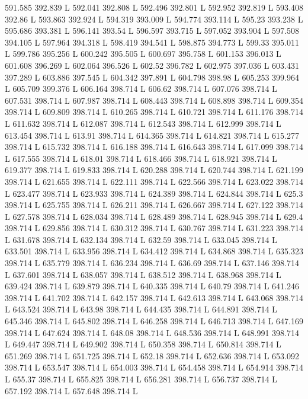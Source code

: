591.585 392.839 L
592.041 392.808 L
592.496 392.801 L
592.952 392.819 L
593.408 392.86 L
593.863 392.924 L
594.319 393.009 L
594.774 393.114 L
595.23 393.238 L
595.686 393.381 L
596.141 393.54 L
596.597 393.715 L
597.052 393.904 L
597.508 394.105 L
597.964 394.318 L
598.419 394.541 L
598.875 394.773 L
599.33 395.011 L
599.786 395.256 L
600.242 395.505 L
600.697 395.758 L
601.153 396.013 L
601.608 396.269 L
602.064 396.526 L
602.52 396.782 L
602.975 397.036 L
603.431 397.289 L
603.886 397.545 L
604.342 397.891 L
604.798 398.98 L
605.253 399.964 L
605.709 399.376 L
606.164 398.714 L
606.62 398.714 L
607.076 398.714 L
607.531 398.714 L
607.987 398.714 L
608.443 398.714 L
608.898 398.714 L
609.354 398.714 L
609.809 398.714 L
610.265 398.714 L
610.721 398.714 L
611.176 398.714 L
611.632 398.714 L
612.087 398.714 L
612.543 398.714 L
612.999 398.714 L
613.454 398.714 L
613.91 398.714 L
614.365 398.714 L
614.821 398.714 L
615.277 398.714 L
615.732 398.714 L
616.188 398.714 L
616.643 398.714 L
617.099 398.714 L
617.555 398.714 L
618.01 398.714 L
618.466 398.714 L
618.921 398.714 L
619.377 398.714 L
619.833 398.714 L
620.288 398.714 L
620.744 398.714 L
621.199 398.714 L
621.655 398.714 L
622.111 398.714 L
622.566 398.714 L
623.022 398.714 L
623.477 398.714 L
623.933 398.714 L
624.389 398.714 L
624.844 398.714 L
625.3 398.714 L
625.755 398.714 L
626.211 398.714 L
626.667 398.714 L
627.122 398.714 L
627.578 398.714 L
628.034 398.714 L
628.489 398.714 L
628.945 398.714 L
629.4 398.714 L
629.856 398.714 L
630.312 398.714 L
630.767 398.714 L
631.223 398.714 L
631.678 398.714 L
632.134 398.714 L
632.59 398.714 L
633.045 398.714 L
633.501 398.714 L
633.956 398.714 L
634.412 398.714 L
634.868 398.714 L
635.323 398.714 L
635.779 398.714 L
636.234 398.714 L
636.69 398.714 L
637.146 398.714 L
637.601 398.714 L
638.057 398.714 L
638.512 398.714 L
638.968 398.714 L
639.424 398.714 L
639.879 398.714 L
640.335 398.714 L
640.79 398.714 L
641.246 398.714 L
641.702 398.714 L
642.157 398.714 L
642.613 398.714 L
643.068 398.714 L
643.524 398.714 L
643.98 398.714 L
644.435 398.714 L
644.891 398.714 L
645.346 398.714 L
645.802 398.714 L
646.258 398.714 L
646.713 398.714 L
647.169 398.714 L
647.624 398.714 L
648.08 398.714 L
648.536 398.714 L
648.991 398.714 L
649.447 398.714 L
649.902 398.714 L
650.358 398.714 L
650.814 398.714 L
651.269 398.714 L
651.725 398.714 L
652.18 398.714 L
652.636 398.714 L
653.092 398.714 L
653.547 398.714 L
654.003 398.714 L
654.458 398.714 L
654.914 398.714 L
655.37 398.714 L
655.825 398.714 L
656.281 398.714 L
656.737 398.714 L
657.192 398.714 L
657.648 398.714 L
